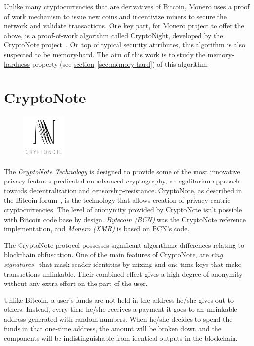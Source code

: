 Unlike many cryptocurrencies that are derivatives of Bitcoin, Monero uses a proof of work mechanism to issue new coins and incentivize miners to secure the network and validate transactions. One key part, for Monero project to offer the above, is a proof-of-work algorithm called \hyperref[ch:cryptonight]{CryptoNight}, developed by the \hyperref[sec:CryptoNote]{CryptoNote} project~\cite{citeulike:14139412}. On top of typical security attributes, this algorithm is also suspected to be memory-hard. The aim of this work is to study the \hyperref[sec:memory-hard]{memory-hardness} property (see \hyperref[sec:memory-hard]{section}~\ref{sec:memory-hard}) of this algorithm.
\clearpage
\pagebreak

\section{CryptoNote} \label{sec:CryptoNote}
\begin{figure}
\centering
\includegraphics[width=0.20\textwidth]{Images/CryptoNote/cryptonote.png}
\end{figure}
The \emph{CryptoNote Technology} is designed to provide some of the most innovative privacy features predicated on advanced cryptography, an egalitarian approach towards decentralization and censorship-resistance. CryptoNote, as described in the Bitcoin forum~\cite{btcforum}, is the technology that allows creation of privacy-centric cryptocurrencies. The level of anonymity provided by CryptoNote isn't possible with Bitcoin code base by design. \emph{Bytecoin (BCN)} was the CryptoNote reference implementation, and \emph{Monero (XMR)} is based on BCN's code.

The CryptoNote protocol possesses significant algorithmic differences relating to blockchain obfuscation. One of the main features of CryptoNote, are \emph{ring signatures}~\cite{citeulike:14139412} that mask sender identities by mixing and one-time keys that make transactions unlinkable. Their combined effect gives a high degree of anonymity without any extra effort on the part of the user.

Unlike Bitcoin, a user's funds are not held in the address he/she gives out to others. Instead, every time he/she receives a payment it goes to an unlinkable address generated with random numbers. When he/she decides to spend the funds in that one-time address, the amount will be broken down and the components will be indistinguishable from identical outputs in the blockchain.

